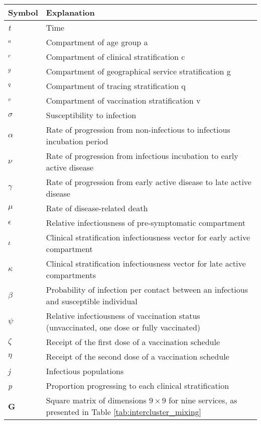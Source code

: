 \begin{table}[ht]
\renewcommand{\baselinestretch}{1}
    	\begin{tabular}{| p{2cm} | p{11.1cm} |}
    	\hline
    		Symbol & Explanation \\
    		\hline
    		\textit{t} & Time  \\
    		$_{\textit{a}}$ & Compartment of age group a \\
    		$_{\textit{c}}$ & Compartment of clinical stratification c \\
    		$_{\textit{g}}$ & Compartment of geographical service stratification g \\
    		$_{\textit{q}}$ & Compartment of tracing stratification q \\
    		$_{\textit{v}}$ & Compartment of vaccination stratification v \\
    		$\sigma$ & Susceptibility to infection \\
    		$\alpha$ & Rate of progression from non-infectious to infectious incubation period \\
    		$\nu$ & Rate of progression from infectious incubation to early active disease \\
    		$\gamma$ & Rate of progression from early active disease to late active disease \\
    		$\mu$ & Rate of disease-related death \\
    		$\epsilon$ & Relative infectiousness of pre-symptomatic compartment \\
    		$\iota$ & Clinical stratification infectiousness vector for early active compartment \\
    		$\kappa$ & Clinical stratification infectiousness vector for late active compartments \\
    		$\beta$ & Probability of infection per contact between an infectious and susceptible individual \\
    		$\psi$ & Relative infectiousness of vaccination status (unvaccinated, one dose or fully vaccinated) \\
    		$\zeta$ & Receipt of the first dose of a vaccination schedule \\
    		$\eta$ & Receipt of the second dose of a vaccination schedule \\
	    	\textit{j} & Infectious populations \\
    		\textit{p} & Proportion progressing to each clinical stratification \\
    		\textbf{G} & Square matrix of dimensions \(9 \times 9\) for nine services, as presented in Table \ref{tab:intercluster_mixing} \\
    \hline
	\end{tabular}
\end{table}

